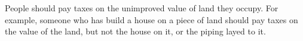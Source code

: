 People should pay taxes on the unimproved value of land they occupy. For example, someone who has build a house on a piece of land should pay taxes on the value of the land, but not the house on it, or the piping layed to it.
